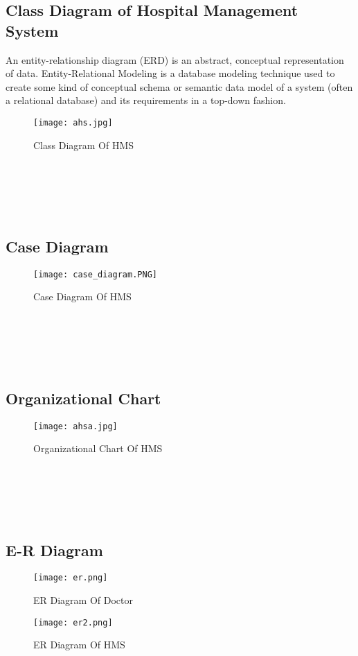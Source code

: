 \documentclass{article}
\begin{document}
\subsection{Class Diagram of Hospital Management System}
An entity-relationship diagram (ERD) is an abstract, conceptual representation of data. Entity-Relational Modeling is a database modeling technique used to create some kind of conceptual schema or semantic data model of a system (often a relational database) and its requirements in a top-down fashion.
\begin{figure}[htp]
    \centering
    \texttt{[image: ahs.jpg]}
    \caption{Class Diagram Of HMS }
    \label{fig:Class Diagram Of HMS  }
\end{figure}
\\\\\\\
\newpage
\subsection{Case Diagram}
\begin{figure}[htp]
    \centering
    \texttt{[image: case\_diagram.PNG]}
    \caption{Case Diagram Of HMS }
    \label{fig:Case Diagram Of HMS  }
\end{figure}
\\\\\\\

\newpage
\subsection{Organizational Chart}
\begin{figure}[htp]
    \centering
    \texttt{[image: ahsa.jpg]}
    \caption{Organizational Chart Of HMS }
    \label{fig:Case Diagram Of HMS  }
\end{figure}
\\\\\\\
\newpage
\subsection{E-R Diagram}
\begin{figure}[htp]
    \centering
    \texttt{[image: er.png]}
    \caption{ER Diagram Of Doctor }
    \label{fig:ER Diagram Of Doctor  }
\end{figure}
\begin{figure}[htp]
    \centering
    \texttt{[image: er2.png]}
    \caption{ER Diagram Of HMS }
    \label{fig:ER Diagram Of HMS  }
\end{figure}
\end{document}
